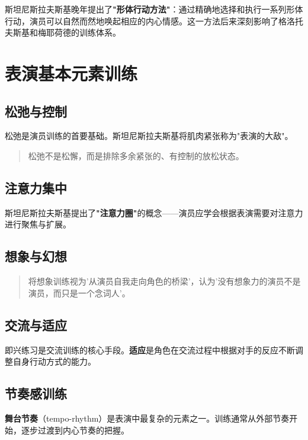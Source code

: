 斯坦尼斯拉夫斯基晚年提出了\textbf{"形体行动方法"}：通过精确地选择和执行一系列形体行动，演员可以自然而然地唤起相应的内心情感\cite{stanislavski:system}。这一方法后来深刻影响了格洛托夫斯基\cite{grotowski:theatre}和梅耶荷德的训练体系。

\section{表演基本元素训练}

\subsection{松弛与控制}

松弛是演员训练的首要基础。斯坦尼斯拉夫斯基将肌肉紧张称为"表演的大敌"\cite{stanislavski:system}。

\begin{quote}
松弛不是松懈，而是排除多余紧张的、有控制的放松状态。\cite{yang:perform}
\end{quote}

\subsection{注意力集中}

斯坦尼斯拉夫斯基提出了\textbf{"注意力圈"}的概念——演员应学会根据表演需要对注意力进行聚焦与扩展\cite{stanislavski:system}。

\subsection{想象与幻想}

\begin{quote}
将想象训练视为'从演员自我走向角色的桥梁'，认为'没有想象力的演员不是演员，而只是一个念词人'。\cite{zhang:acting}
\end{quote}

\subsection{交流与适应}

即兴练习是交流训练的核心手段。\textbf{适应}是角色在交流过程中根据对手的反应不断调整自身行动方式的能力。

\subsection{节奏感训练}

\textbf{舞台节奏}（tempo-rhythm）是表演中最复杂的元素之一。训练通常从外部节奏开始，逐步过渡到内心节奏的把握。

